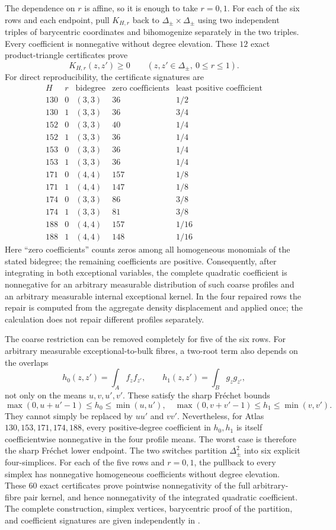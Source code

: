 \documentclass[11pt]{article}
\begin{document}
The dependence on $r$ is affine, so it is enough to take $r=0,1$.
For each of the six rows and each endpoint, pull $K_{H,r}$ back to
$\Delta_\pm\times\Delta_\pm$ using two independent triples of barycentric
coordinates and bihomogenize separately in the two triples.  Every
coefficient is nonnegative without degree elevation.  These $12$ exact
product-triangle certificates prove
\[
 K_{H,r}(z,z')\geq0
 \qquad
 (z,z'\in\Delta_\pm,\ 0\leq r\leq1).
\]
For direct reproducibility, the certificate signatures are
\[
\begin{array}{c|c|c|c|c}
H&r&\text{bidegree}&\text{zero coefficients}&
 \text{least positive coefficient}\\ \hline
130&0&(3,3)&36&1/2\\
130&1&(3,3)&36&3/4\\
152&0&(3,3)&40&1/4\\
152&1&(3,3)&36&1/4\\
153&0&(3,3)&36&1/4\\
153&1&(3,3)&36&1/4\\
171&0&(4,4)&157&1/8\\
171&1&(4,4)&147&1/8\\
174&0&(3,3)&86&3/8\\
174&1&(3,3)&81&3/8\\
188&0&(4,4)&157&1/16\\
188&1&(4,4)&148&1/16
\end{array}
\]
Here ``zero coefficients'' counts zeros among all homogeneous monomials of
the stated bidegree; the remaining coefficients are positive.
Consequently, after integrating in both exceptional variables, the complete
quadratic coefficient is nonnegative for an arbitrary measurable
distribution of such coarse profiles and an arbitrary measurable internal
exceptional kernel.  In the four repaired rows the repair is computed from
the aggregate density displacement and applied once; the calculation does
not repair different profiles separately.

The coarse restriction can be removed completely for five of the six rows.
For arbitrary measurable exceptional-to-bulk fibres, a two-root term also
depends on the overlaps
\[
 h_0(z,z')=\int_A f_zf_{z'},
 \qquad
 h_1(z,z')=\int_B g_zg_{z'},
\]
not only on the means $u,v,u',v'$.  These satisfy the sharp Fr\'echet bounds
\[
 \max(0,u+u'-1)\leq h_0\leq\min(u,u'),
 \quad
 \max(0,v+v'-1)\leq h_1\leq\min(v,v').
\]
They cannot simply be replaced by $uu'$ and $vv'$.  Nevertheless, for Atlas
$130,153,171,174,188$, every positive-degree coefficient in $h_0,h_1$ is
itself coefficientwise nonnegative in the four profile means.  The worst
case is therefore the sharp Fr\'echet lower endpoint.  The two switches
partition $\Delta_\pm^2$ into six explicit four-simplices.  For each of the
five rows and $r=0,1$, the pullback to every simplex has nonnegative
homogeneous coefficients without degree elevation.  These $60$ exact
certificates prove pointwise nonnegativity of the full arbitrary-fibre pair
kernel, and hence nonnegativity of the integrated quadratic coefficient.
The complete construction, simplex vertices, barycentric proof of the
partition, and coefficient signatures are given independently in
.
\end{document}
